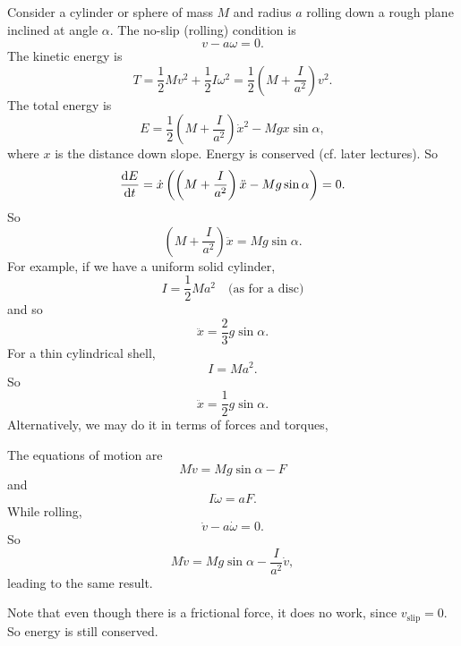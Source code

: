 \documentclass[a4paper]{article}
\begin{document}
\begin{eg}
  Consider a cylinder or sphere of mass $M$ and radius $a$ rolling down a rough plane inclined at angle $\alpha$. The no-slip (rolling) condition is
  \[
    v - a\omega = 0 .
  \]
  The kinetic energy is
  \[
    T = \frac{1}{2}Mv^2 + \frac{1}{2}I\omega^2 = \frac{1}{2}\left(M + \frac{I}{a^2}\right)v^2.
  \]
  The total energy is
  \[
    E = \frac{1}{2}\left(M + \frac{I}{a^2}\right) \dot{x}^2 - Mgx\sin \alpha,
  \]
  where $x$ is the distance down slope. Energy is conserved (cf. later lectures). So
  \[
    \frac{\mathrm{d} E}{\mathrm{d} t} = \dot{x}\left(\left(M + \frac{I}{a^2}\right)\ddot{x} - Mg\sin \alpha\right) = 0.
  \]
  So
  \[
    \left(M + \frac{I}{a^2}\right)\ddot{x} = Mg\sin \alpha.
  \]
  For example, if we have a uniform solid cylinder,
  \[
    I = \frac{1}{2}Ma^2\quad\text{(as for a disc)}
  \]
  and so
  \[
    \ddot{x} = \frac{2}{3}g\sin \alpha.
  \]
  For a thin cylindrical shell,
  \[
    I = Ma^2.
  \]
  So
  \[
    \ddot{x} = \frac{1}{2}g\sin \alpha.
  \]
  Alternatively, we may do it in terms of forces and torques,
  \begin{center}
  \end{center}
  The equations of motion are
  \[
    M\dot{v} = Mg\sin \alpha - F
  \]
  and
  \[
    I\dot \omega = aF.
  \]
  While rolling,
  \[
    \dot{v} - a\dot\omega = 0.
  \]
  So
  \[
    M\dot{v} = Mg\sin \alpha - \frac{I}{a^2}\dot{v},
  \]
  leading to the same result.

  Note that even though there is a frictional force, it does no work, since $v_{\mathrm{slip}} = 0$. So energy is still conserved.
\end{eg}
\end{document}
